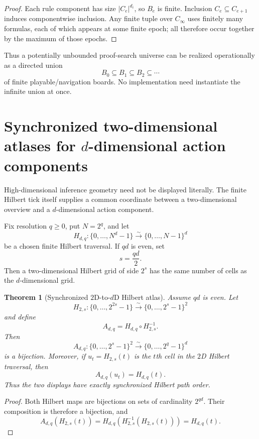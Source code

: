 \documentclass[11pt]{article}
\newtheorem{theorem}{Theorem}[section]
\theoremstyle{definition}
\begin{document}
\begin{proof}
Each rule component has size $|C_e|^{d_i}$, so $B_e$ is finite. Inclusion $C_e\subseteq C_{e+1}$ induces componentwise inclusion. Any finite tuple over $C_\infty$ uses finitely many formulas, each of which appears at some finite epoch; all therefore occur together by the maximum of those epochs.
\end{proof}

Thus a potentially unbounded proof-search universe can be realized operationally as a directed union
\[
B_0\subseteq B_1\subseteq B_2\subseteq\cdots
\]
of finite playable/navigation boards. No implementation need instantiate the infinite union at once.

\section{Synchronized two-dimensional atlases for \texorpdfstring{$d$}{d}-dimensional action components}

High-dimensional inference geometry need not be displayed literally. The finite Hilbert tick itself supplies a common coordinate between a two-dimensional overview and a $d$-dimensional action component.

Fix resolution $q\ge 0$, put $N=2^q$, and let
\[
H_{d,q}:\{0,\ldots,N^d-1\}\overset{\sim}{\longrightarrow}\{0,\ldots,N-1\}^d
\]
be a chosen finite Hilbert traversal. If $qd$ is even, set
\[
s=\frac{qd}{2}.
\]
Then a two-dimensional Hilbert grid of side $2^s$ has the same number of cells as the $d$-dimensional grid.

\begin{theorem}[Synchronized $2$D-to-$d$D Hilbert atlas]\label{thm:atlas}
Assume $qd$ is even. Let
\[
H_{2,s}:\{0,\ldots,2^{2s}-1\}\overset{\sim}{\longrightarrow}\{0,\ldots,2^s-1\}^2
\]
and define
\[
A_{d,q}=H_{d,q}\circ H_{2,s}^{-1}.
\]
Then
\[
A_{d,q}:\{0,\ldots,2^s-1\}^2
\overset{\sim}{\longrightarrow}
\{0,\ldots,2^q-1\}^d
\]
is a bijection. Moreover, if $u_t=H_{2,s}(t)$ is the $t$th cell in the $2$D Hilbert traversal, then
\[
A_{d,q}(u_t)=H_{d,q}(t).
\]
Thus the two displays have exactly synchronized Hilbert path order.
\end{theorem}

\begin{proof}
Both Hilbert maps are bijections on sets of cardinality $2^{qd}$. Their composition is therefore a bijection, and
\[
A_{d,q}(H_{2,s}(t))
=
H_{d,q}(H_{2,s}^{-1}(H_{2,s}(t)))
=
H_{d,q}(t).
\]
\end{proof}
\end{document}
